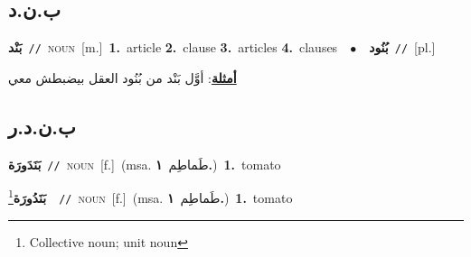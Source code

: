 \documentclass[10pt,a4paper,twoside]{article} %
\begin{document}
\begin{multicols}{2}
\vspace{-3mm}
\subsection*{\color{blue}\foreignlanguage{arabic}{ب.ن.د}\color{blue}{}} 

{\setlength\topsep{0pt}\textbf{\foreignlanguage{arabic}{بَنْد}}\ {\color{gray}\texttt{//}\color{black}}\ \textsc{noun}\ [m.]\ \textbf{1.}~article  \textbf{2.}~clause  \textbf{3.}~articles  \textbf{4.}~clauses\ \ $\bullet$\ \ \setlength\topsep{0pt}\textbf{\foreignlanguage{arabic}{بُنُود}}\ {\color{gray}\texttt{//}\color{black}}\ [pl.]\  \begin{flushright}\color{gray}\foreignlanguage{arabic}{\textbf{\underline{\foreignlanguage{arabic}{أمثلة}}}: أوَّل بَنْد من بُنُود العقل بيضبطش معي}\end{flushright}\color{black}} \vspace{2mm}

\vspace{-3mm}
\subsection*{\color{blue}\foreignlanguage{arabic}{ب.ن.د.ر}\color{blue}{}} 

{\setlength\topsep{0pt}\textbf{\foreignlanguage{arabic}{بَنَدَورَة}}\ {\color{gray}\texttt{//}\color{black}}\ \textsc{noun}\ [f.]\ \color{gray}(msa. \foreignlanguage{arabic}{طَماطِم}~\foreignlanguage{arabic}{\textbf{١.}})\color{black}\ \textbf{1.}~tomato\ } \vspace{2mm}

{\setlength\topsep{0pt}\textbf{\foreignlanguage{arabic}{بَنَدُورَة}}\footnote{Collective noun; unit noun}\ \ {\color{gray}\texttt{//}\color{black}}\ \textsc{noun}\ [f.]\ \color{gray}(msa. \foreignlanguage{arabic}{طَماطِم}~\foreignlanguage{arabic}{\textbf{١.}})\color{black}\ \textbf{1.}~tomato\ } \vspace{2mm}


\end{multicols}
\end{document}
